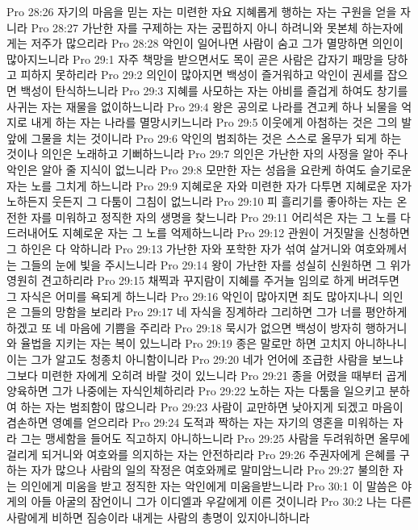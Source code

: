 Pro 28:26  자기의 마음을 믿는 자는 미련한 자요 지혜롭게 행하는 자는 구원을 얻을 자니라
Pro 28:27  가난한 자를 구제하는 자는 궁핍하지 아니 하려니와 못본체 하는자에게는 저주가 많으리라
Pro 28:28  악인이 일어나면 사람이 숨고 그가 멸망하면 의인이 많아지느니라
Pro 29:1  자주 책망을 받으면서도 목이 곧은 사람은 갑자기 패망을 당하고 피하지 못하리라
Pro 29:2  의인이 많아지면 백성이 즐거워하고 악인이 권세를 잡으면 백성이 탄식하느니라
Pro 29:3  지혜를 사모하는 자는 아비를 즐겁게 하여도 창기를 사귀는 자는 재물을 없이하느니라
Pro 29:4  왕은 공의로 나라를 견고케 하나 뇌물을 억지로 내게 하는 자는 나라를 멸망시키느니라
Pro 29:5  이웃에게 아첨하는 것은 그의 발 앞에 그물을 치는 것이니라
Pro 29:6  악인의 범죄하는 것은 스스로 올무가 되게 하는 것이나 의인은 노래하고 기뻐하느니라
Pro 29:7  의인은 가난한 자의 사정을 알아 주나 악인은 알아 줄 지식이 없느니라
Pro 29:8  모만한 자는 성읍을 요란케 하여도 슬기로운 자는 노를 그치게 하느니라
Pro 29:9  지혜로운 자와 미련한 자가 다투면 지혜로운 자가 노하든지 웃든지 그 다툼이 그침이 없느니라
Pro 29:10  피 흘리기를 좋아하는 자는 온전한 자를 미워하고 정직한 자의 생명을 찾느니라
Pro 29:11  어리석은 자는 그 노를 다 드러내어도 지혜로운 자는 그 노를 억제하느니라
Pro 29:12  관원이 거짓말을 신청하면 그 하인은 다 악하니라
Pro 29:13  가난한 자와 포학한 자가 섞여 살거니와 여호와께서는 그들의 눈에 빛을 주시느니라
Pro 29:14  왕이 가난한 자를 성실히 신원하면 그 위가 영원히 견고하리라
Pro 29:15  채찍과 꾸지람이 지혜를 주거늘 임의로 하게 버려두면 그 자식은 어미를 욕되게 하느니라
Pro 29:16  악인이 많아지면 죄도 많아지나니 의인은 그들의 망함을 보리라
Pro 29:17  네 자식을 징계하라 그리하면 그가 너를 평안하게 하겠고 또 네 마음에 기쁨을 주리라
Pro 29:18  묵시가 없으면 백성이 방자히 행하거니와 율법을 지키는 자는 복이 있느니라
Pro 29:19  종은 말로만 하면 고치지 아니하나니 이는 그가 알고도 청종치 아니함이니라
Pro 29:20  네가 언어에 조급한 사람을 보느냐 그보다 미련한 자에게 오히려 바랄 것이 있느니라
Pro 29:21  종을 어렸을 때부터 곱게 양육하면 그가 나중에는 자식인체하리라
Pro 29:22  노하는 자는 다툼을 일으키고 분하여 하는 자는 범죄함이 많으니라
Pro 29:23  사람이 교만하면 낮아지게 되겠고 마음이 겸손하면 영예를 얻으리라
Pro 29:24  도적과 짝하는 자는 자기의 영혼을 미워하는 자라 그는 맹세함을 들어도 직고하지 아니하느니라
Pro 29:25  사람을 두려워하면 올무에 걸리게 되거니와 여호와를 의지하는 자는 안전하리라
Pro 29:26  주권자에게 은혜를 구하는 자가 많으나 사람의 일의 작정은 여호와께로 말미암느니라
Pro 29:27  불의한 자는 의인에게 미움을 받고 정직한 자는 악인에게 미움을받느니라
Pro 30:1  이 말씀은 야게의 아들 아굴의 잠언이니 그가 이디엘과 우갈에게 이른 것이니라
Pro 30:2  나는 다른 사람에게 비하면 짐승이라 내게는 사람의 총명이 있지아니하니라
